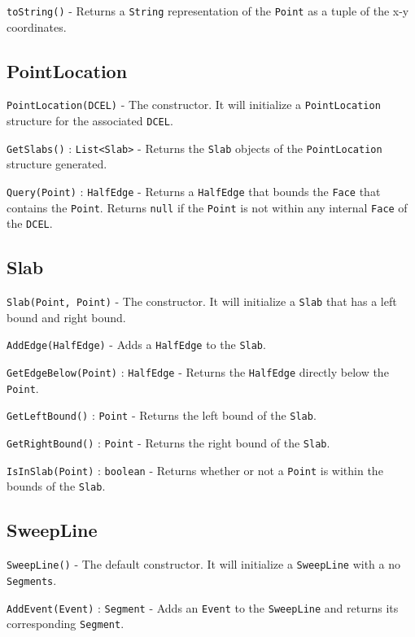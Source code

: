 \documentclass[11pt]{article}
\begin{document}
\texttt{toString()} - Returns a \texttt{String} representation of the \texttt{Point} as a tuple of the x-y coordinates.

\subsection{PointLocation}
\label{sec:pointlocation}

\texttt{PointLocation(DCEL)} - The constructor. It will initialize a \texttt{PointLocation} structure for the associated \texttt{DCEL}.

\texttt{GetSlabs()} : \texttt{List<Slab>} - Returns the \texttt{Slab} objects of the \texttt{PointLocation} structure generated.
 
\texttt{Query(Point)} : \texttt{HalfEdge} - Returns a \texttt{HalfEdge} that bounds the \texttt{Face} that contains the \texttt{Point}. Returns \texttt{null} if the \texttt{Point} is not within any internal \texttt{Face} of the \texttt{DCEL}.

\subsection{Slab}
\label{sec:slab}

\texttt{Slab(Point, Point)} - The constructor. It will initialize a \texttt{Slab} that has a left bound and right bound.

\texttt{AddEdge(HalfEdge)} - Adds a \texttt{HalfEdge} to the \texttt{Slab}.

\texttt{GetEdgeBelow(Point)} : \texttt{HalfEdge} - Returns the \texttt{HalfEdge} directly below the \texttt{Point}.

\texttt{GetLeftBound()} : \texttt{Point} - Returns the left bound of the \texttt{Slab}.

\texttt{GetRightBound()} : \texttt{Point} - Returns the right bound of the \texttt{Slab}.

\texttt{IsInSlab(Point)} : \texttt{boolean} - Returns whether or not a \texttt{Point} is within the bounds of the \texttt{Slab}.

\subsection{SweepLine}
\label{sec:sweepline}

\texttt{SweepLine()} - The default constructor. It will initialize a \texttt{SweepLine} with a no \texttt{Segments}.

\texttt{AddEvent(Event)} : \texttt{Segment} - Adds an \texttt{Event} to the \texttt{SweepLine} and returns its corresponding \texttt{Segment}.
\end{document}
